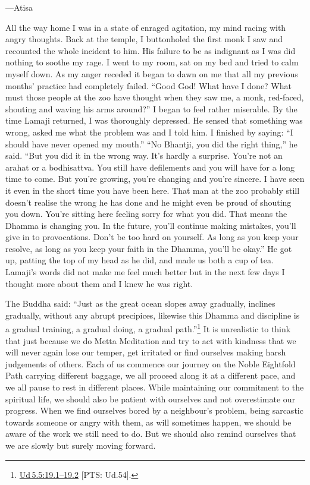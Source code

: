 \documentclass[10pt, openright]{book}
\newenvironment{epigram-2-cite}%
{%
\quoting[leftmargin=2.5cm,rightmargin=2.5cm]%
\noindent\normal\hspace*{\fill} 
}%
{\endquoting\vspace{1em}
}%
\begin{document}
\begin{epigram-2-cite}
—Atisa
\end{epigram-2-cite}

All the way home I was in a state of enraged agitation, my mind racing with angry thoughts. Back at the temple, I buttonholed the first monk I saw and recounted the whole incident to him. His failure to be as indignant as I was did nothing to soothe my rage. I went to my room, sat on my bed and tried to calm myself down. As my anger receded it began to dawn on me that all my previous months’ practice had completely failed. “Good God! What have I done? What must those people at the zoo have thought when they saw me, a monk, red-faced, shouting and waving his arms around?” I began to feel rather miserable. By the time Lamaji returned, I was thoroughly depressed. He sensed that something was wrong, asked me what the problem was and I told him. I finished by saying: “I should have never opened my mouth.” “No Bhantji, you did the right thing,” he said. “But you did it in the wrong way. It’s hardly a surprise. You’re not an arahat or a bodhisattva. You still have defilements and you will have for a long time to come. But you’re growing, you’re changing and you’re sincere. I have seen it even in the short time you have been here. That man at the zoo probably still doesn’t realise the wrong he has done and he might even be proud of shouting you down. You’re sitting here feeling sorry for what you did. That means the Dhamma is changing you. In the future, you’ll continue making mistakes, you’ll give in to provocations. Don’t be too hard on yourself. As long as you keep your resolve, as long as you keep your faith in the Dhamma, you’ll be okay.” He got up, patting the top of my head as he did, and made us both a cup of tea. Lamaji’s words did not make me feel much better but in the next few days I thought more about them and I knew he was right.


The Buddha said: “Just as the great ocean slopes away gradually, inclines gradually, without any abrupt precipices, likewise this Dhamma and discipline is a gradual training, a gradual doing, a gradual path.”\footnote {\href{https://suttacentral.net/ud5.5/en/sujato\#19.1}{Ud 5.5:19.1–19.2} [PTS: Ud.54].} It is unrealistic to think that just because we do Metta Meditation and try to act with kindness that we will never again lose our temper, get irritated or find ourselves making harsh judgements of others. Each of us commence our journey on the Noble Eightfold Path carrying different baggage, we all proceed along it at a different pace, and we all pause to rest in different places. While maintaining our commitment to the spiritual life, we should also be patient with ourselves and not overestimate our progress. When we find ourselves bored by a neighbour’s problem, being sarcastic towards someone or angry with them, as will sometimes happen, we should be aware of the work we still need to do. But we should also remind ourselves that we are slowly but surely moving forward.
\end{document}
